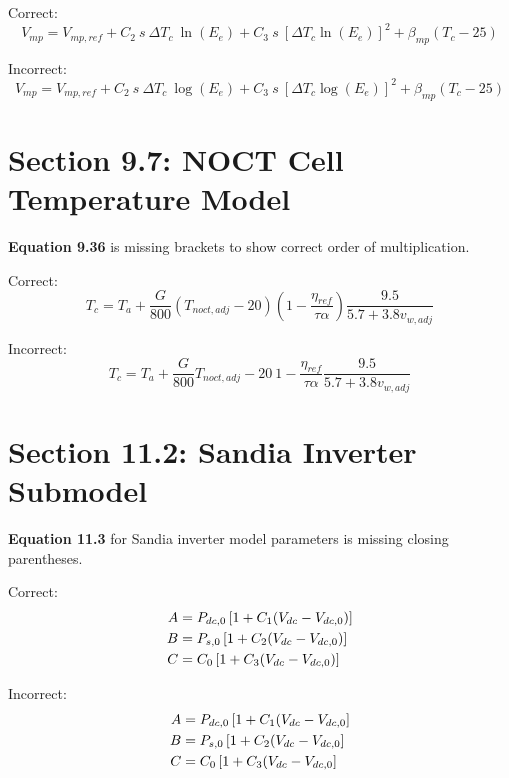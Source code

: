\documentclass[report]{nrel}
\begin{document}
Correct:
\begin{equation*}
V_{mp} = V_{mp,ref} +
 C_2~s~\Delta T_c~\ln(E_e) +
 C_3~s~\left[\Delta T_c \ln(E_e)\right]^2 +
 \beta_{mp} (T_c - 25)
\end{equation*}

Incorrect:
\begin{equation*}
V_{mp} = V_{mp,ref} +
 C_2~s~\Delta T_c~\log(E_e) +
 C_3~s~\left[\Delta T_c \log(E_e)\right]^2 +
 \beta_{mp} (T_c - 25)
\end{equation*}

\section*{Section 9.7: NOCT Cell Temperature Model}

\textbf{Equation 9.36} is missing brackets to show correct order of multiplication.

Correct:
\begin{equation*}
T_c = T_a + \frac{G}{800} \left(T_{noct,adj} - 20 \right) \left(1-\frac{\eta_{ref}}{\tau \alpha}\right) \frac{9.5}{5.7+3.8v_{w,adj}}
\end{equation*}

Incorrect:
\begin{equation*}
T_c = T_a + \frac{G}{800} T_{noct,adj} - 20~ 1-\frac{\eta_{ref}}{\tau \alpha} \frac{9.5}{5.7+3.8v_{w,adj}}
\end{equation*}

\section*{Section 11.2: Sandia Inverter Submodel}

\textbf{Equation 11.3} for Sandia inverter model parameters is missing closing parentheses.

Correct:
\begin{align*}
A &=P_{dc,0} \left[ 1+ C_1 ( V_{dc} - V_{dc,0} )\right] \notag\\
B &= P_{s,0}  \left[ 1+ C_2 ( V_{dc} - V_{dc,0} )\right] \notag\\
C &= C_0  \left[ 1+ C_3 ( V_{dc} - V_{dc,0} )\right]
\end{align*}

Incorrect:
\begin{align*}
A &=P_{dc,0} \left[ 1+ C_1 ( V_{dc} - V_{dc,0}\right] \notag\\
B &= P_{s,0}  \left[ 1+ C_2 ( V_{dc} - V_{dc,0}\right] \notag\\
C &= C_0  \left[ 1+ C_3 ( V_{dc} - V_{dc,0}\right]
\end{align*}
\end{document}
